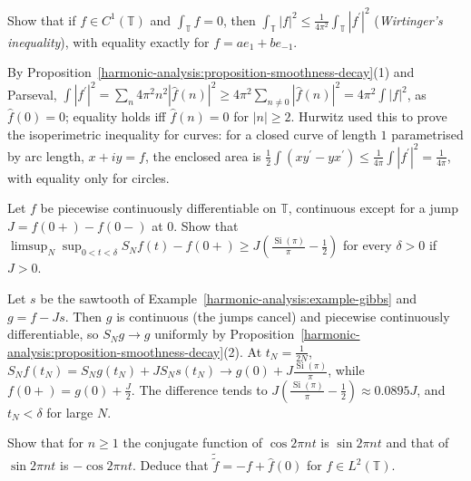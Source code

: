\begin{exercise}\label{harmonic-analysis:exercise-wirtinger}
Show that if $f \in C^1(\mathbb{T})$ and $\int_\mathbb{T}f = 0$, then $\int_\mathbb{T}|f|^2 \leq \frac{1}{4\pi^2}\int_\mathbb{T}|f^{\prime}|^2$ (\emph{Wirtinger's inequality}), with equality exactly for $f = ae_1 + be_{-1}$.
\end{exercise}

\begin{solution}
By Proposition~\ref{harmonic-analysis:proposition-smoothness-decay}(1) and Parseval, $\int|f^{\prime}|^2 = \sum_n4\pi^2n^2|\hat f(n)|^2 \geq 4\pi^2\sum_{n \neq 0}|\hat f(n)|^2 = 4\pi^2\int|f|^2$, as $\hat f(0) = 0$; equality holds iff
$\hat f(n) = 0$ for $|n| \geq 2$. Hurwitz used this to prove the isoperimetric inequality for curves: for a closed curve of length $1$ parametrised by arc length, $x + iy = f$, the enclosed area is
$\frac12\int(xy^{\prime} - yx^{\prime}) \leq \frac{1}{4\pi}\int|f^{\prime}|^2 = \frac{1}{4\pi}$, with equality only for circles.
\end{solution}

\begin{exercise}\label{harmonic-analysis:exercise-gibbs-general}
Let $f$ be piecewise continuously differentiable on $\mathbb{T}$, continuous except for a jump $J = f(0+) - f(0-)$ at $0$. Show that $\limsup_{N}\sup_{0 < t < \delta}S_Nf(t) - f(0+) \geq J(\frac{\operatorname{Si}(\pi)}{\pi} - \frac12)$ for every
$\delta > 0$ if $J > 0$.
\end{exercise}

\begin{solution}
Let $s$ be the sawtooth of Example~\ref{harmonic-analysis:example-gibbs} and $g = f - Js$. Then $g$ is continuous (the jumps cancel) and piecewise continuously differentiable, so $S_Ng \to g$ uniformly by
Proposition~\ref{harmonic-analysis:proposition-smoothness-decay}(2). At $t_N = \frac{1}{2N}$, $S_Nf(t_N) = S_Ng(t_N) + JS_Ns(t_N) \to g(0) + J\frac{\operatorname{Si}(\pi)}{\pi}$, while $f(0+) = g(0) + \frac J2$. The difference
tends to $J(\frac{\operatorname{Si}(\pi)}{\pi} - \frac12) \approx 0.0895J$, and $t_N < \delta$ for large $N$.
\end{solution}

\begin{exercise}\label{harmonic-analysis:exercise-conjugate-trigonometric}
Show that for $n \geq 1$ the conjugate function of $\cos 2\pi nt$ is $\sin 2\pi nt$ and that of $\sin 2\pi nt$ is $-\cos 2\pi nt$. Deduce that $\tilde{\tilde f} = -f + \hat f(0)$ for $f \in L^2(\mathbb{T})$.
\end{exercise}

